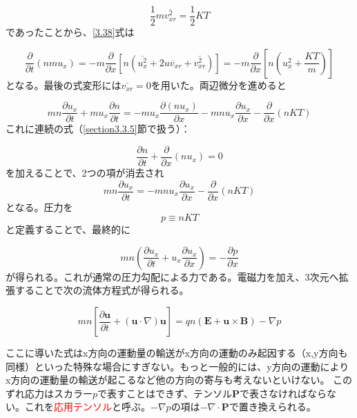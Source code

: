 \documentclass{ltjsarticle}
\numberwithin{equation}{section} %
\begin{document}
\begin{equation}
  \frac{1}{2}m\overline{v^2_{xr}} = \frac{1}{2}KT \label{3.39}
\end{equation}
であったことから、\eqref{3.38}式は

\[
  \frac{\partial}{\partial t}(nmu_x) = -m\frac{\partial}{\partial x}\left[n(\overline{u^2_x} + 2\overline{uv_{xr}} + \overline{v^2_{xr}})\right] = -m\frac{\partial}{\partial x}\left[n\left(u^2_x + \frac{KT}{m}\right)\right]
\]
となる。最後の式変形には$\overline{v_{xr}} = 0$を用いた。両辺微分を進めると

\begin{equation}
  mn\frac{\partial u_x}{\partial t} + mu_x\frac{\partial n}{\partial t} = -mu_x\frac{\partial (nu_x)}{\partial x} - mnu_x\frac{\partial u_x}{\partial x} - \frac{\partial}{\partial x}(nKT) \label{3.40}
\end{equation}
これに連続の式（\ref{section3.3.5}節で扱う）：

\begin{equation}
  \frac{\partial n}{\partial t} + \frac{\partial}{\partial x}(nu_x) = 0 \label{3.41}
\end{equation}
を加えることで、2つの項が消去され
\[
  mn\frac{\partial u_x}{\partial t} = - mnu_x\frac{\partial u_x}{\partial x} - \frac{\partial}{\partial x}(nKT) 
\]
となる。圧力を
\begin{equation}
  \boxed{p \equiv nKT} \label{3.42}
\end{equation}
と定義することで、最終的に

\begin{equation}
  mn\left(\frac{\partial u_x}{\partial t} + u_x \frac{\partial u_x}{\partial x}\right) = -\frac{\partial p}{\partial x} \label{3.43}
\end{equation}
が得られる。これが通常の圧力勾配による力である。電磁力を加え、3次元へ拡張することで次の流体方程式が得られる。

\begin{equation}
  mn\left[\frac{\partial \bm{u}}{\partial t} + (\bm{u}\cdot \nabla)\bm{u}\right] = qn(\bm{E} + \bm{u}\times \bm{B}) - \nabla p \label{3.44}
\end{equation}

ここに導いた式はx方向の運動量の輸送がx方向の運動のみ起因する（x,y方向も同様）といった特殊な場合にすぎない。もっと一般的には、y方向の運動によりx方向の運動量の輸送が起こるなど他の方向の寄与も考えないといけない。
このずれ応力はスカラー$p$で表すことはできず、テンソル$\bm{P}$で表さなければならない。これを\textcolor{red}{応用テンソル}と呼ぶ。$-\nabla p$の項は$-\nabla \cdot \bm{P}$で置き換えられる。
\end{document}
